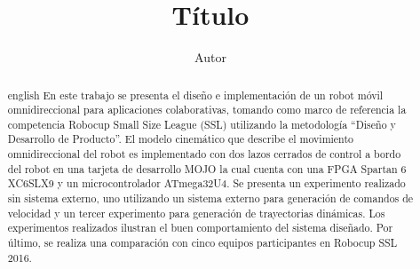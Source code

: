 \documentclass{tesisITAM}
\title{Título}
\author{Autor}
\begin{document}
	
	\maketitle
	\hypersetup{pageanchor=false}
	\publicationrights



	\begin{abstract}{english}
		En este trabajo se presenta el diseño e implementación de un robot móvil omnidireccional para aplicaciones colaborativas, tomando como marco de referencia la competencia Robocup Small Size League (SSL) utilizando la metodología ``Diseño y Desarrollo de Producto''. El modelo cinemático que describe el movimiento omnidireccional del robot es implementado con dos lazos cerrados de control a bordo del robot en una tarjeta de desarrollo MOJO la cual cuenta con una FPGA Spartan 6 XC6SLX9 y un microcontrolador ATmega32U4. Se presenta un experimento realizado sin sistema externo, uno utilizando un sistema externo para generación de comandos de velocidad y un tercer experimento para generación de trayectorias dinámicas. Los experimentos realizados ilustran el buen comportamiento del sistema diseñado. Por último, se realiza una comparación con cinco equipos participantes en Robocup SSL 2016.
	\end{abstract}


	

	\tableofcontents
	\listoffigures
	\listoftables
	
	\newpage

	
	
	

	

% 	

% 	

% 	


	\appendix
	
	\clearpage
% 	
% 	
    \printglossary[type=\acronymtype, title={ACRONIMOS}] 
	\printglossary[title={GLOSARIO}]

	\clearpage %
	
	

	 
	
\end{document}
